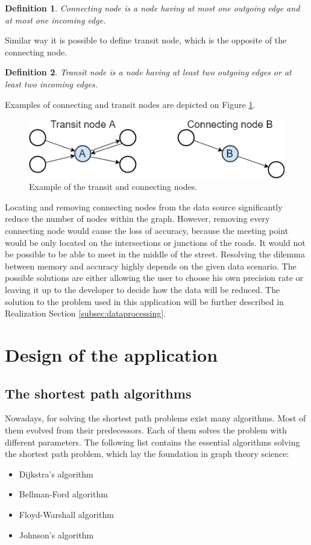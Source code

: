 \documentclass[thesis=M,english]{FITthesis}[2012/10/20]
\newtheorem{defin}{Definition}
\begin{document}
\begin{defin}
\label{def:connect}
Connecting node is a node having at most one outgoing edge and at most one incoming edge. 
\end{defin}

Similar way it is possible to define transit node, which is the opposite of the connecting node. 

\begin{defin}
\label{def:transit}
Transit node is a node having at least two outgoing edges or at least two incoming edges. 
\end{defin}

Examples of connecting and transit nodes are depicted on Figure \ref{pic:CaTnodes}.

\begin{figure}[H]
\centering
\includegraphics[width=1\textwidth]{pics/CaTNodes}
\caption{Example of the transit and connecting nodes.}
\label{pic:CaTnodes}
\end{figure}


Locating and removing connecting nodes from the data source significantly reduce the number of nodes within the graph. However, removing every connecting node would cause the loss of accuracy, because the meeting point would be only located on the intersections or junctions of the roads. It would not be possible to be able to meet in the middle of the street. 
Resolving the dilemma between memory and accuracy highly depends on the given data scenario. The possible solutions are either allowing the user to choose his own precision rate or leaving it up to the developer to decide how the data will be reduced. The solution to the problem used in this application will be further described in Realization Section \ref{subsec:dataprocessing}.

\chapter{Design of the application}
\label{ch:DOTA}

\section{The shortest path algorithms}
Nowadays, for solving the shortest path problems exist many algorithms. Most of them evolved from their predecessors. Each of them solves the problem with different parameters. 
The following list contains the essential algorithms solving the shortest path problem, which lay the foundation in graph theory science:
\begin{itemize}
\item Dijkstra's algorithm
\item Bellman-Ford algorithm
\item Floyd-Warshall algorithm
\item Johnson's algorithm 
\end{itemize}
\end{document}

